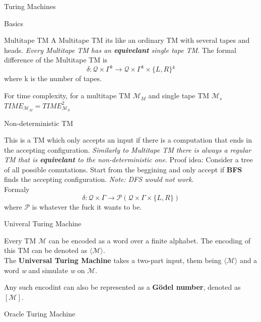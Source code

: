 \documentclass[12pt, letterpaper]{article}
\begin{document}
\begin{section}{Turing Machines}
\begin{subsection}{Basics}
\begin{subsubsection}{Multitape TM}
      A Multitape TM its like an ordinary TM with several tapes and heads.
      \emph{Every Multitape TM has an \textbf{equivelant} single tape TM}.
      The formal difference of the Multitape TM is
      \[\delta: \mathcal{Q} \times \Gamma^{k} \to \mathcal{Q} \times \Gamma^{k} \times \{{} L, R \}{}^{k}\]
      where k is the number of tapes.

      For time complexity, for a multitape TM \(\mathscr{M}_{M}\) and single tape
      TM \(\mathscr{M}_{s}\) \linebreak \(TIME_{\mathscr{M}_{M}} = TIME_{\mathscr{M}_{S}}^{2}\)

    \end{subsubsection}

    \begin{subsubsection}{Non-deterministic TM}

      This is a TM which only accepts an input if there is a computation
      that ends in the accepting configuration. \emph{Similarly to Multitape TM
        there is always a regular TM that is \textbf{equivelant}
        to the non-deterministic one}. Proof idea: Consider a tree
      of all possible comutations. Start from the beggining and only accept if
      \textbf{BFS} finds the accepting configuration. \textit{Note: DFS would not work}. \\
      Formaly
      \[\delta: \mathcal{Q} \times \Gamma \to \mathscr{P}(\mathcal{Q} \times \Gamma \times \{{} L, R \}{})\]
      where \(\mathscr{P}\) is whatever the fuck it wants to be.
      
    \end{subsubsection}

    \begin{subsubsection}{Univeral Turing Machine}

      Every TM \(\mathscr{M}\) can be encoded as a word over a finite alphabet.
      The encoding of this TM can be denoted as \(\langle \mathscr{M} \rangle\). \\
      The \textbf{Universal Turing Machine} takes a two-part input, them being
      \(\langle \mathscr{M} \rangle\) and a word \textit{w} and simulate
      \textit{w} on \(\mathscr{M}\).

      Any such encodint can also be represented as a \textbf{Gödel number},
      denoted as \([\mathscr{M}]\).

    \end{subsubsection}

    \begin{subsubsection}{Oracle Turing Machine}


\end{subsubsection}
\end{subsection}
\end{section}
\end{document}
